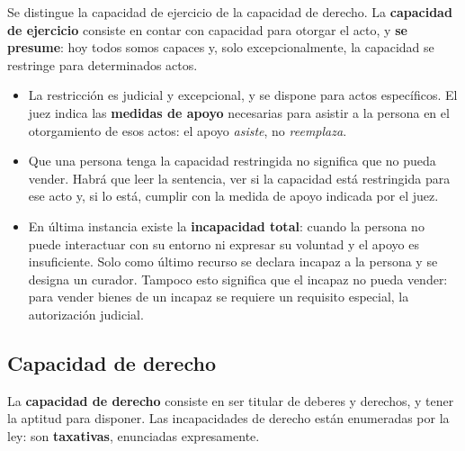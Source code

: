 \documentclass[12pt,oneside]{book}
\begin{document}
Se distingue la capacidad de ejercicio de la capacidad de derecho. La \textbf{capacidad de ejercicio} consiste en contar con capacidad para otorgar el acto, y \textbf{se presume}: hoy todos somos capaces y, solo excepcionalmente, la capacidad se restringe para determinados actos.

\begin{itemize}
    \item La restricción es judicial y excepcional, y se dispone para actos específicos. El juez indica las \textbf{medidas de apoyo} necesarias para asistir a la persona en el otorgamiento de esos actos: el apoyo \emph{asiste}, no \emph{reemplaza}.
    \item Que una persona tenga la capacidad restringida no significa que no pueda vender. Habrá que leer la sentencia, ver si la capacidad está restringida para ese acto y, si lo está, cumplir con la medida de apoyo indicada por el juez.
    \item En última instancia existe la \textbf{incapacidad total}: cuando la persona no puede interactuar con su entorno ni expresar su voluntad y el apoyo es insuficiente. Solo como último recurso se declara incapaz a la persona y se designa un curador. Tampoco esto significa que el incapaz no pueda vender: para vender bienes de un incapaz se requiere un requisito especial, la autorización judicial.
\end{itemize}

\subsection{Capacidad de derecho}

La \textbf{capacidad de derecho} consiste en ser titular de deberes y derechos, y tener la aptitud para disponer. Las incapacidades de derecho están enumeradas por la ley: son \textbf{taxativas}, enunciadas expresamente.
\end{document}
